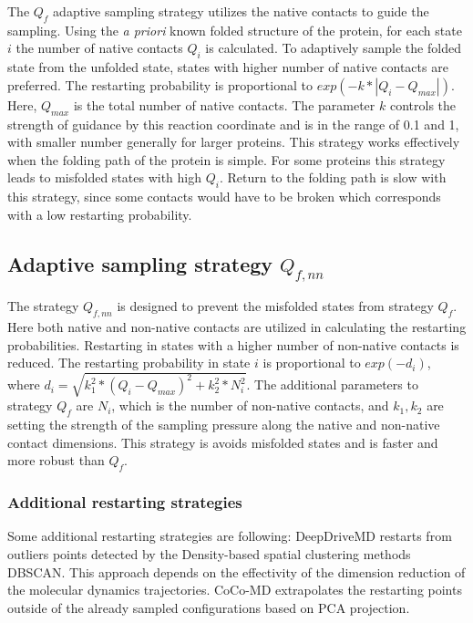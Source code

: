 The  $Q_{f}$ adaptive sampling strategy utilizes the native contacts to guide the sampling. Using the \emph{a priori} known folded structure of the protein, for each state $i$ the number of native contacts $Q_i$ is calculated. To adaptively sample the folded state from the unfolded state, states with higher number of native contacts are preferred. The restarting probability is proportional to $exp( - k * | Q_i - Q_{max} | )$. Here, $Q_{max}$ is the total number of native contacts. The parameter $k$ controls the strength of guidance by this reaction coordinate and is in the range of 0.1 and 1, with smaller number generally for larger proteins. This strategy works effectively when the folding path of the protein is simple. For some proteins this strategy leads to misfolded states with high $Q_i$. Return to the folding path is slow with this strategy, since some contacts would have to be broken which corresponds with a low restarting probability.

\subsection{Adaptive sampling strategy $Q_{f,nn}$}

The strategy $Q_{f, nn}$ is designed to prevent the misfolded states from strategy $Q_{f}$.
Here both native and non-native contacts are utilized in calculating the restarting probabilities. Restarting in states with a higher number of non-native contacts is reduced.
The restarting probability in state $i$ is proportional to $exp(-d_i)$, where $d_i = \sqrt{k_1^2 * (Q_i - Q_{max})^2  + k_2^2 * N_i^2}$. 
The additional parameters to strategy $Q_{f}$ are $N_i$, which is the number of
non-native contacts, and $k_1, k_2$ are setting the strength of the sampling pressure along the native and non-native contact dimensions. This strategy is avoids misfolded states and is faster and more robust than $Q_{f}$.

\subsubsection{Additional restarting strategies}
Some additional restarting strategies are following:
DeepDriveMD\cite{leeDeepDriveMDDeepLearningDriven2019} restarts from outliers points detected by the Density-based spatial clustering methods DBSCAN. This approach depends on the effectivity of the dimension reduction of the molecular dynamics trajectories. CoCo-MD extrapolates the restarting points outside of the already sampled configurations based on PCA projection\cite{shkurti2019jctc,harada2015jctc,harada2017jctc}.  

